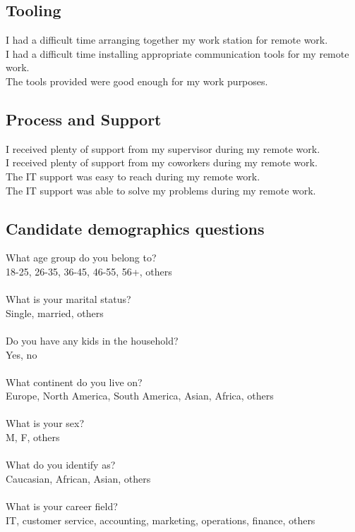 \documentclass[12pt]{article}
\begin{document}
\subsection*{Tooling} 

I had a difficult time arranging together my work station for remote work.  \\
I had a difficult time installing appropriate communication tools for my remote work.  \\
The tools  provided were good enough for my work purposes. 

\subsection*{Process and Support}

I received plenty of support from my supervisor during my remote work. \\
I received plenty of support from my coworkers during my remote work. \\
The IT support was easy to reach during my remote work. \\
The IT support was able to solve my problems during my remote work.


\subsection*{Candidate demographics questions}

What age group do you belong to? \\
18-25, 26-35, 36-45, 46-55, 56+, others \\ \\
What is your marital status? \\
Single, married, others \\ \\
Do you have any kids in the household? \\
Yes, no \\ \\
What continent do you live on? \\
Europe, North America, South America, Asian, Africa, others \\ \\
What is your sex? \\
M, F, others \\ \\
What do you identify as? \\
Caucasian, African, Asian, others \\ \\
What is your career field? \\
IT, customer service, accounting, marketing, operations, finance, others 
\end{document}
